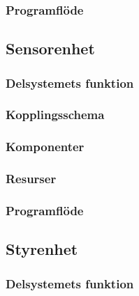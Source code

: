 \documentclass{article}
\begin{document}
\subsubsection{Programflöde}


\clearpage

\subsection{Sensorenhet}

\subsubsection{Delsystemets funktion}

\subsubsection{Kopplingsschema}

\subsubsection{Komponenter}

\subsubsection{Resurser}

\subsubsection{Programflöde}

\clearpage

\subsection{Styrenhet}

\subsubsection{Delsystemets funktion}
\end{document}
